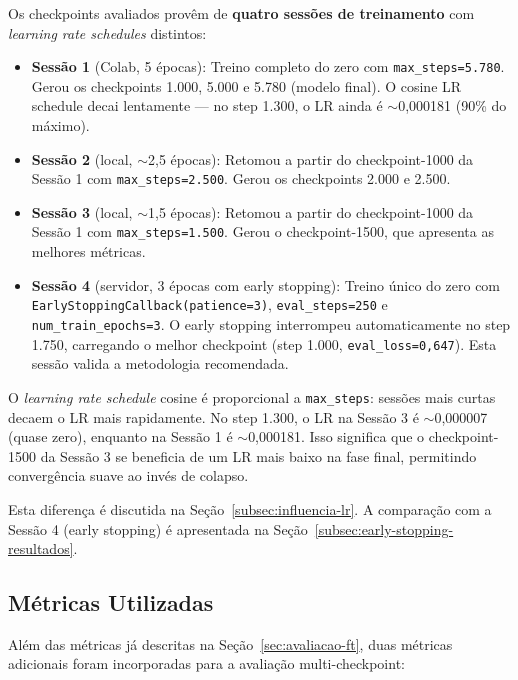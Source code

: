 \begin{warningbox}
Os checkpoints avaliados provêm de \textbf{quatro sessões de treinamento} com \textit{learning rate schedules} distintos:

\begin{itemize}
    \item \textbf{Sessão 1} (Colab, 5 épocas): Treino completo do zero com \texttt{max\_steps=5.780}. Gerou os checkpoints 1.000, 5.000 e 5.780 (modelo final). O cosine LR schedule decai lentamente --- no step 1.300, o LR ainda é $\sim$0,000181 (90\% do máximo).
    \item \textbf{Sessão 2} (local, $\sim$2,5 épocas): Retomou a partir do checkpoint-1000 da Sessão 1 com \texttt{max\_steps=2.500}. Gerou os checkpoints 2.000 e 2.500.
    \item \textbf{Sessão 3} (local, $\sim$1,5 épocas): Retomou a partir do checkpoint-1000 da Sessão 1 com \texttt{max\_steps=1.500}. Gerou o checkpoint-1500, que apresenta as melhores métricas.
    \item \textbf{Sessão 4} (servidor, 3 épocas com early stopping): Treino único do zero com \texttt{EarlyStoppingCallback(patience=3)}, \texttt{eval\_steps=250} e \texttt{num\_train\_epochs=3}. O early stopping interrompeu automaticamente no step 1.750, carregando o melhor checkpoint (step 1.000, \texttt{eval\_loss=0,647}). Esta sessão valida a metodologia recomendada.
\end{itemize}

O \textit{learning rate schedule} cosine é proporcional a \texttt{max\_steps}: sessões mais curtas decaem o LR mais rapidamente. No step 1.300, o LR na Sessão 3 é $\sim$0,000007 (quase zero), enquanto na Sessão 1 é $\sim$0,000181. Isso significa que o checkpoint-1500 da Sessão 3 se beneficia de um LR mais baixo na fase final, permitindo convergência suave ao invés de colapso.

Esta diferença é discutida na Seção~\ref{subsec:influencia-lr}. A comparação com a Sessão 4 (early stopping) é apresentada na Seção~\ref{subsec:early-stopping-resultados}.
\end{warningbox}

\subsection{Métricas Utilizadas}

Além das métricas já descritas na Seção~\ref{sec:avaliacao-ft}, duas métricas adicionais foram incorporadas para a avaliação multi-checkpoint:

